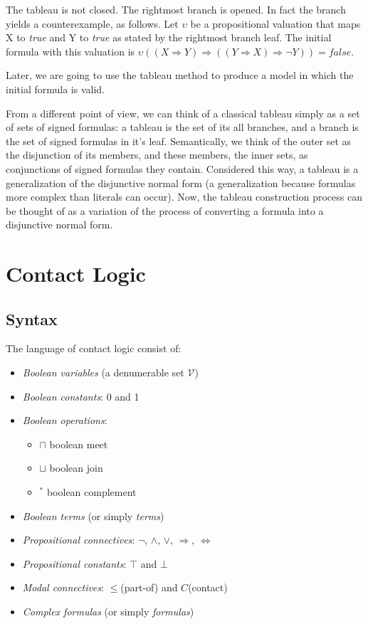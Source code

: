 \documentclass{article}
\newcommand\V{\mathcal{V}}
\begin{document}
	\par
	The tableau is not closed. The rightmost branch is opened. In fact the branch yields a counterexample, as follows. Let $\upsilon$ be a propositional valuation that maps X to \textit{true} and Y to \textit{true} as stated by the rightmost branch leaf. The initial formula with this valuation is $\upsilon((X \Rightarrow Y) \Rightarrow ((Y \Rightarrow X) \Rightarrow \neg Y)) = false$.

	\par
	Later, we are going to use the tableau method to produce a model in which the initial formula is valid.
	\par
	From a different point of view, we can think of a classical tableau simply as a set of sets of signed formulas: a tableau is the set of its all branches, and a branch is the set of signed formulas in it's leaf. Semantically, we think of the outer set as the disjunction of its members, and these members, the inner sets, as conjunctions of signed formulas they contain. Considered this way, a tableau is a generalization of the disjunctive normal form (a generalization because formulas more complex than literals can occur). Now, the tableau construction process can be thought of as a variation of the process of converting a formula into a disjunctive normal form.

	\newpage
	\section{Contact Logic}
	\subsection{Syntax}
	The language of contact logic consist of:
	\begin{itemize}
		\item \textit{Boolean variables} (a denumerable set $\V$)
		\item \textit{Boolean constants}: 0 and 1
		\item \textit{Boolean operations}:
		\begin{itemize}
			\item $\sqcap$ boolean meet
			\item $\sqcup$ boolean join
			\item $^*$ boolean complement
		\end{itemize}
		\item \textit{Boolean terms} (or simply \textit{terms})
		\item \textit{Propositional connectives}: $\neg$, $\land$, $\lor$, $\Rightarrow$, $\Leftrightarrow$
		\item \textit{Propositional constants}: $\top$ and $\bot$
		\item \textit{Modal connectives}: $\leq$(part-of) and $C$(contact)
		\item \textit{Complex formulas} (or simply \textit{formulas})
	\end{itemize}
\end{document}
